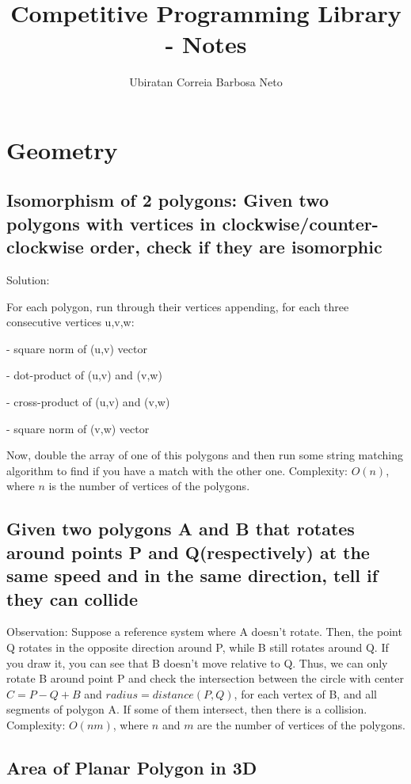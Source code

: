 \documentclass[12pt]{article}%
\begin{document}
\title{Competitive Programming Library - Notes}
\author{Ubiratan Correia Barbosa Neto}
\maketitle

\section{Geometry}

\subsection{Isomorphism of 2 polygons: Given two polygons with vertices in clockwise/counter-clockwise order, check if they are isomorphic}

Solution:

For each polygon, run through their vertices appending, for each three consecutive vertices u,v,w:

- square norm of (u,v) vector

- dot-product of (u,v) and (v,w)

- cross-product of (u,v) and (v,w)

- square norm of (v,w) vector

Now, double the array of one of this polygons and then run some string matching algorithm to find if you have a match with the other one. Complexity: $O(n)$, where $n$ is the number of vertices of the polygons. 

\subsection{Given two polygons A and B that rotates around points P and Q(respectively) at the same speed and in the same direction, tell if they can collide}

Observation: Suppose a reference system where A doesn't rotate. Then, the point Q rotates in the opposite direction around P, while B still rotates around Q. If you draw it, you can see that B doesn't move relative to Q. Thus, we can only rotate B around point P and check the intersection between the circle with center $C = P - Q + B$ and $radius = distance(P,Q)$, for each vertex of B, and all segments of polygon A. If some of them intersect, then there is a collision. Complexity: $O(nm)$, where $n$ and $m$ are the number of vertices of the polygons.

\subsection{Area of Planar Polygon in 3D}
\end{document}
